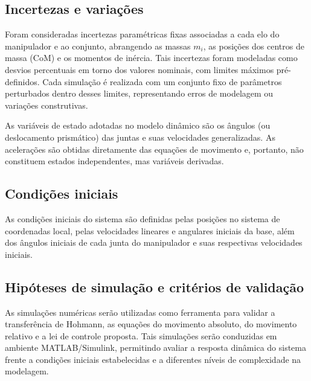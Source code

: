 

\subsection{Incertezas e variações}
Foram consideradas incertezas paramétricas fixas associadas a cada elo do manipulador e ao conjunto, abrangendo as massas $m_i$, as posições dos centros de massa (CoM) e os momentos de inércia.
Tais incertezas foram modeladas como desvios percentuais em torno dos valores nominais, com limites máximos pré-definidos.
Cada simulação é realizada com um conjunto fixo de parâmetros perturbados dentro desses limites, representando erros de modelagem ou variações construtivas.  

As variáveis de estado adotadas no modelo dinâmico são os ângulos (ou deslocamento prismático) das juntas e suas velocidades generalizadas.
As acelerações são obtidas diretamente das equações de movimento e, portanto, não constituem estados independentes, mas variáveis derivadas.

\subsection{Condições iniciais}
As condições iniciais do sistema são definidas pelas posições no sistema de coordenadas local, pelas velocidades lineares e angulares iniciais da base, além dos ângulos iniciais de cada junta do manipulador e suas respectivas velocidades iniciais.

\subsection{Hipóteses de simulação e critérios de validação}

As simulações numéricas serão utilizadas como ferramenta para validar a transferência de Hohmann, as equações do movimento absoluto, do movimento relativo e a lei de controle proposta.
Tais simulações serão conduzidas em ambiente MATLAB/Simulink, permitindo avaliar a resposta dinâmica do sistema frente a condições iniciais estabelecidas e a diferentes níveis de complexidade na modelagem.

